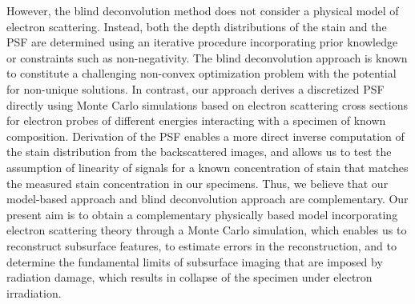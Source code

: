 \documentclass{article}
\begin{document}
However, the blind deconvolution method does not consider a physical model of electron scattering. Instead, both the depth distributions of the stain and the PSF are determined using an iterative procedure incorporating prior knowledge or constraints such as non-negativity. The blind deconvolution approach is known to constitute a challenging non-convex optimization problem with the potential for non-unique solutions. In contrast, our approach derives a discretized PSF directly using Monte Carlo simulations based on electron scattering cross sections for electron probes of different energies interacting with a specimen of known composition. Derivation of the PSF enables a more direct inverse computation of the stain distribution from the backscattered images, and allows us to test the assumption of linearity of signals for a known concentration of stain that matches the measured stain concentration in our specimens. Thus, we believe that our model-based approach and blind deconvolution approach are complementary. Our present aim is to obtain a complementary physically based model incorporating electron scattering theory through a Monte Carlo simulation, which enables us to reconstruct subsurface features, to estimate errors in the reconstruction, and to determine the fundamental limits of subsurface imaging that are imposed by radiation damage, which results in collapse of the specimen under electron irradiation.
\end{document}
